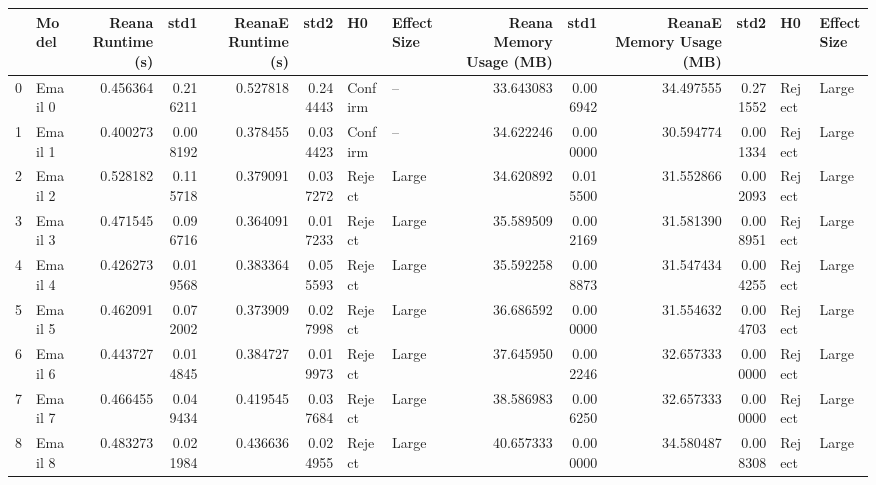 \begin{tabular}{llrrrrllrrrrll}
\toprule
{} &     Model &  Reana Runtime (s) &      std1 &  ReanaE Runtime (s) &      std2 &       H0 & Effect Size &  Reana Memory Usage (MB) &       std1 &  ReanaE Memory Usage (MB) &       std2 &      H0 & Effect Size \\
\midrule
0  &   Email 0 &           0.456364 &  0.216211 &            0.527818 &  0.244443 &  Confirm &          -- &                33.643083 &   0.006942 &                 34.497555 &   0.271552 &  Reject &       Large \\
1  &   Email 1 &           0.400273 &  0.008192 &            0.378455 &  0.034423 &  Confirm &          -- &                34.622246 &   0.000000 &                 30.594774 &   0.001334 &  Reject &       Large \\
2  &   Email 2 &           0.528182 &  0.115718 &            0.379091 &  0.037272 &   Reject &       Large &                34.620892 &   0.015500 &                 31.552866 &   0.002093 &  Reject &       Large \\
3  &   Email 3 &           0.471545 &  0.096716 &            0.364091 &  0.017233 &   Reject &       Large &                35.589509 &   0.002169 &                 31.581390 &   0.008951 &  Reject &       Large \\
4  &   Email 4 &           0.426273 &  0.019568 &            0.383364 &  0.055593 &   Reject &       Large &                35.592258 &   0.008873 &                 31.547434 &   0.004255 &  Reject &       Large \\
5  &   Email 5 &           0.462091 &  0.072002 &            0.373909 &  0.027998 &   Reject &       Large &                36.686592 &   0.000000 &                 31.554632 &   0.004703 &  Reject &       Large \\
6  &   Email 6 &           0.443727 &  0.014845 &            0.384727 &  0.019973 &   Reject &       Large &                37.645950 &   0.002246 &                 32.657333 &   0.000000 &  Reject &       Large \\
7  &   Email 7 &           0.466455 &  0.049434 &            0.419545 &  0.037684 &   Reject &       Large &                38.586983 &   0.006250 &                 32.657333 &   0.000000 &  Reject &       Large \\
8  &   Email 8 &           0.483273 &  0.021984 &            0.436636 &  0.024955 &   Reject &       Large &                40.657333 &   0.000000 &                 34.580487 &   0.008308 &  Reject &       Large \\

\end{tabular}
